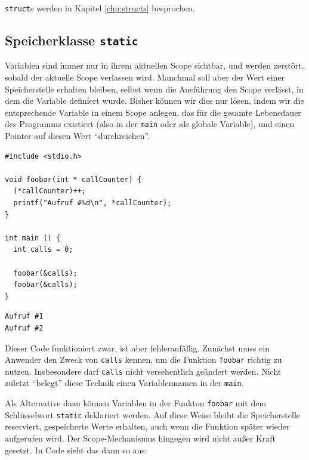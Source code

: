 \texttt{struct}s werden in Kapitel \ref{chp:structs} besprochen.

\subsection{Speicherklasse \texttt{static}} \label{sec:staticVar}
Variablen sind immer nur in ihrem aktuellen Scope sichtbar, und werden \idR zerstört, sobald der aktuelle Scope verlassen wird. Manchmal soll aber der Wert einer Speicherstelle erhalten bleiben, selbst wenn die Ausführung den Scope verlässt, in dem die Variable definiert wurde. Bisher können wir dies nur lösen, indem wir die entsprechende Variable in einem Scope anlegen, das für die gesamte Lebensdauer des Programms existiert (also in der \texttt{main} oder als globale Variable), und einen Pointer auf diesen Wert \enquote{durchreichen}.

\begin{codebox}
\begin{verbatim}
#include <stdio.h>

void foobar(int * callCounter) {
  (*callCounter)++;
  printf("Aufruf #%d\n", *callCounter);
}

int main () {
  int calls = 0;
  
  foobar(&calls);
  foobar(&calls);
}
\end{verbatim}
\end{codebox}

\begin{cmdbox}
\begin{verbatim}
Aufruf #1
Aufruf #2
\end{verbatim}
\end{cmdbox}

Dieser Code funktioniert zwar, ist aber fehleranfällig. Zunächst muss ein Anwender den Zweck von \texttt{calls} kennen, um die Funktion \texttt{foobar} richtig zu nutzen. Insbesondere darf \texttt{calls} nicht versehentlich geändert werden. Nicht zuletzt \enquote{belegt} diese Technik einen Variablennamen in der \texttt{main}.

Als Alternative dazu können Variablen in der Funkton \texttt{foobar} mit dem Schlüsselwort \texttt{static} deklariert werden. Auf diese Weise bleibt die Speicherstelle reserviert, \ie gespeicherte Werte erhalten, auch wenn die Funktion später wieder aufgerufen wird. Der Scope-Mechanismus hingegen wird nicht außer Kraft gesetzt. In Code sieht das dann so aus:

